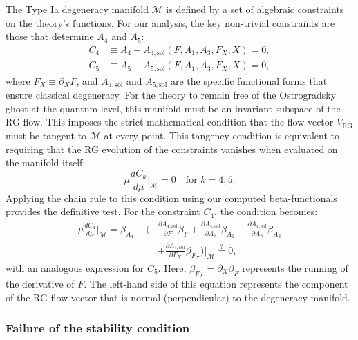 \documentclass[twocolumn]{aastex631}
\begin{document}
The Type Ia degeneracy manifold $\mathcal{M}$ is defined by a set of algebraic constraints on the theory's functions. For our analysis, the key non-trivial constraints are those that determine $A_4$ and $A_5$:
\begin{align}
    C_4 &\equiv A_4 - A_{4,\text{sol}}(F, A_1, A_3, F_X, X) = 0, \label{eq:C4_def} \\
    C_5 &\equiv A_5 - A_{5,\text{sol}}(F, A_1, A_3, F_X, X) = 0, \label{eq:C5_def}
\end{align}
where $F_X \equiv \partial_X F$, and $A_{4,\text{sol}}$ and $A_{5,\text{sol}}$ are the specific functional forms that ensure classical degeneracy. For the theory to remain free of the Ostrogradsky ghost at the quantum level, this manifold must be an invariant subspace of the RG flow. This imposes the strict mathematical condition that the flow vector $V_{\text{RG}}$ must be tangent to $\mathcal{M}$ at every point. This tangency condition is equivalent to requiring that the RG evolution of the constraints vanishes when evaluated on the manifold itself:
\begin{equation}
    \mu \frac{dC_k}{d\mu} \bigg|_{\mathcal{M}} = 0 \quad \text{for } k=4, 5. \label{eq:tangency_cond}
\end{equation}
Applying the chain rule to this condition using our computed beta-functionals provides the definitive test. For the constraint $C_4$, the condition becomes:
\begin{equation}
\begin{aligned}
    \mu \frac{dC_4}{d\mu} \bigg|_{\mathcal{M}} = \beta_{A_4} - \bigg( &\frac{\partial A_{4,\text{sol}}}{\partial F}\beta_F + \frac{\partial A_{4,\text{sol}}}{\partial A_1}\beta_{A_1} + \frac{\partial A_{4,\text{sol}}}{\partial A_3}\beta_{A_3} \\
    &+ \frac{\partial A_{4,\text{sol}}}{\partial F_X}\beta_{F_X} \bigg) \bigg|_{\mathcal{M}} \stackrel{?}{=} 0,
\end{aligned}
\label{eq:flow_C4}
\end{equation}
with an analogous expression for $C_5$. Here, $\beta_{F_X} = \partial_X \beta_F$ represents the running of the derivative of $F$. The left-hand side of this equation represents the component of the RG flow vector that is normal (perpendicular) to the degeneracy manifold.

\subsubsection{Failure of the stability condition}
\end{document}
